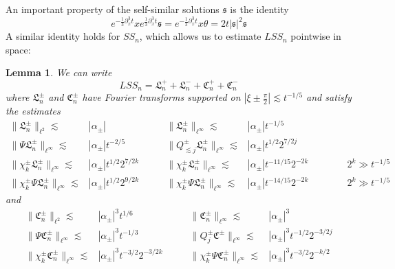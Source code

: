 \documentclass[letterpaper, reqno,final]{amsart}
\newcommand{\fs}{\mathfrak{s}}
\newcommand{\fhPi}{\frac{\pi}{2}}
\newcommand{\fC}{\mathfrak{C}}
\newcommand{\fL}{\mathfrak{L}}
\newcommand{\mSS}{\mathit{SS}}
\newtheorem{lemma}[thm]{Lemma}
\begin{document}
An important property of the self-similar solutions $\fs$ is the identity
\begin{equation*}\label{eqn:self-sim-vf-identity}
    e^{-\frac{1}{3}\partial_x^3 t}x e^{\frac{1}{3}\partial_x^3 t}\fs =e^{-\frac{1}{3}\partial_x^3 t}x \theta =  2t|\fs|^2\fs
\end{equation*}
A similar identity holds for $\mSS_n$, which allows us to estimate $L\mSS_n$ pointwise in space:
\begin{lemma}\label{lem:LSS-expression}
    We can write
    \begin{equation*}
        L \mSS_n = \fL_n^+ + \fL_n^- + \fC_n^+ + \fC_n^-
    \end{equation*}
    where $\fL_n^\pm$ and $\fC_n^\pm$ have Fourier transforms supported on $|\xi \pm \fhPi| \lesssim t^{-1/5}$ and satisfy the estimates
    \begin{equation}\label{eqn:fL-ests}\begin{aligned}
        \lVert \fL_n^\pm \rVert_{\ell^2} \lesssim& |\alpha_\pm| &\qquad
        \lVert \fL_n^\pm \rVert_{\ell^\infty} \lesssim& |\alpha_\pm| t^{-1/5}\\
        \lVert \Psi \fL_n^\pm \rVert_{\ell^\infty} \lesssim& |\alpha_\pm| t^{-2/5}&\qquad
        \lVert Q_{\lesssim j}^\pm \fL_n^\pm \rVert_{\ell^\infty} \lesssim& |\alpha_\pm| t^{1/2} 2^{7/2j}\\
        \lVert \chi_{k}^\pm \fL_n^\pm \rVert_{\ell^\infty} \lesssim& |\alpha_\pm| t^{1/2} 2^{7/2k}&\qquad
        \lVert \chi^\pm_{k} \fL^\pm_n \rVert_{\ell^\infty} \lesssim& |\alpha_\pm| t^{-11/15}2^{-2k}               
        \qquad\qquad 2^k \gg t^{-1/5}\\
        \lVert \chi_{k}^\pm \Psi \fL_n^\pm \rVert_{\ell^\infty} \lesssim& |\alpha_\pm| t^{1/2} 2^{9/2k} &\qquad
        \lVert \chi_{k}^\pm \Psi \fL^\pm_n \rVert_{\ell^\infty} \lesssim& |\alpha_\pm| t^{-14/15} 2^{-2k}	   \qquad\qquad 2^k \gg t^{-1/5}
    \end{aligned}\end{equation}
    and
    \begin{equation}\label{eqn:fC-ests}\begin{aligned}
        \lVert \fC^\pm_n \rVert_{\ell^2} \lesssim& |\alpha_\pm|^3 t^{1/6}&\qquad
        \lVert \fC^\pm_n \rVert_{\ell^\infty} \lesssim& |\alpha_\pm|^3\\
        \lVert \Psi \fC^\pm_n \rVert_{\ell^\infty} \lesssim& |\alpha_\pm|^3t^{-1/3}&\qquad
        \lVert Q_j^\pm \fC^\pm \rVert_{\ell^\infty} \lesssim& |\alpha_\pm|^3 t^{-1/2} 2^{-3/2j}\\
        \lVert \chi_{k}^\pm \fC^\pm_n \rVert_{\ell^\infty} \lesssim& |\alpha_\pm|^3 t^{-3/2} 2^{-3/2 k}&\qquad
        \lVert \chi_{k}^\pm \Psi \fC^\pm_n \rVert_{\ell^\infty} \lesssim& |\alpha_\pm|^3 t^{-3/2} 2^{-k/2}
    \end{aligned}\end{equation}
\end{lemma}
\end{document}
